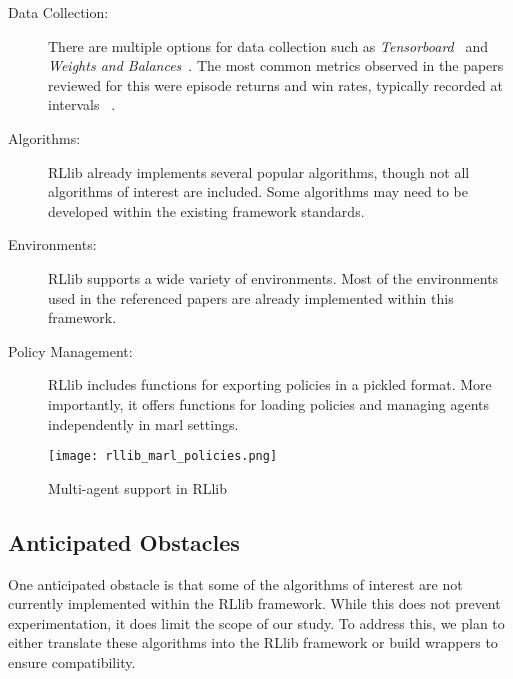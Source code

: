 \begin{description}
    \item[Data Collection:] 
    There are multiple options for data collection such as \emph{Tensorboard}~%
    \cite{zotero-2601} and \emph{Weights and Balances}~\cite{zotero-2603}. 
    The most common metrics observed in the papers reviewed for this \printdoctype 
    were episode returns and win rates, typically recorded at intervals~
    \cite{zhong2024,yu2022,papoudakis2021,lowe2020,zheng2020}.
    \item[Algorithms:] 
    RLlib already implements several popular algorithms, though not all 
    algorithms of interest are included. Some algorithms may need to be 
    developed within the existing framework standards.
    \item[Environments:] 
    RLlib supports a wide variety of environments. Most of the environments 
    used in the referenced papers are already implemented within this framework.
    \item[Policy Management:] 
    RLlib includes functions for exporting policies in a pickled format. 
    More importantly, it offers functions for loading policies and managing 
    agents independently in \gls{marl} settings.
\end{description}
\begin{figure}[htbp]
    \texttt{[image: rllib\_marl\_policies.png]}
    \caption{Multi-agent support in RLlib~\cite{zotero-2599}}
    \label{fig:rllib_marl_policies}
\end{figure}

\subsection{Anticipated Obstacles}
One anticipated obstacle is that some of the algorithms of interest 
are not currently implemented within the RLlib framework. While this 
does not prevent experimentation, it does limit the scope of our study. 
To address this, we plan to either translate these algorithms into 
the RLlib framework or build wrappers to ensure compatibility.

